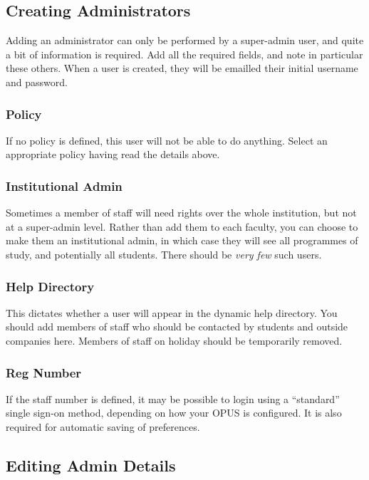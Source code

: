 \documentclass[12 pt]{book}
\begin{document}
\subsection{Creating Administrators}

Adding an administrator can only be performed by a super-admin user, and quite
a bit of information is required. Add all the required fields, and note in
particular these others. When a user is created, they will be emailled their
initial username and password.

\subsubsection{Policy}

If no policy is defined, this user will not be able to do anything. Select an
appropriate policy having read the details above.

\subsubsection{Institutional Admin}

Sometimes a member of staff will need rights over the whole institution, but
not at a super-admin level. Rather than add them to each faculty, you can
choose to make them an institutional admin, in which case they will see all
programmes of study, and potentially all students. There should be 
\emph{very few} such users.

\subsubsection{Help Directory}

This dictates whether a user will appear in the dynamic help directory. You
should add members of staff who should be contacted by students and outside
companies here. Members of staff on holiday should be temporarily removed.

\subsubsection{Reg Number}

If the staff number is defined, it may be possible to login using a ``standard''
single sign-on method, depending on how your OPUS is configured. It is also
required for automatic saving of preferences.

\subsection{Editing Admin Details}
\end{document}
